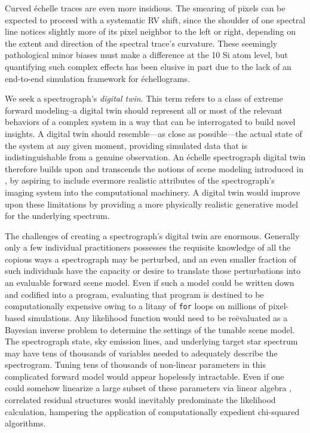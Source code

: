 \documentclass[twocolumn]{aastex631}
\begin{document}
Curved \'echelle traces are even more insidious.  The smearing of pixels can be expected to proceed with a systematic RV shift, since the shoulder of one spectral line notices slightly more of its pixel neighbor to the left or right, depending on the extent and direction of the spectral trace's curvature.  These seemingly pathological minor biases must make a difference at the 10 Si atom level, but quantifying such complex effects has been elusive in part due to the lack of an end-to-end simulation framework for \'echellograms.

We seek a spectrograph's \emph{digital twin}.  This term refers to a class of extreme forward modeling--a digital twin should represent all or most of the relevant behaviors of a complex system in a way that can be interrogated to build novel insights.  A digital twin should resemble---as close as possible---the actual state of the system at any given moment, providing simulated data that is indistinguishable from a genuine observation.  An \'echelle spectrograph digital twin therefore builds upon and transcends the notions of scene modeling introduced in \citet{2010PASP..122..248B}, by aspiring to include evermore realistic attributes of the spectrograph's imaging system into the computational machinery.  A digital twin would improve upon these limitations by providing a more physically realistic generative model for the underlying spectrum.

The challenges of creating a spectrograph's digital twin are enormous.  Generally only a few individual practitioners possesses the requisite knowledge of all the copious ways a spectrograph may be perturbed, and an even smaller fraction of such individuals have the capacity or desire to translate those perturbations into an evaluable forward scene model.  Even if such a model could be written down and codified into a program, evaluating that program is destined to be computationally expensive owing to a litany of \texttt{for} loops on millions of pixel-based simulations.  Any likelihood function would need to be re\"evaluated as a Bayesian inverse problem to determine the settings of the tunable scene model.  The spectrograph state, sky emission lines, and underlying target star spectrum may have tens of thousands of variables needed to adequately describe the spectrogram.  Tuning tens of thousands of non-linear parameters in this complicated forward model would appear hopelessly intractable.  Even if one could somehow linearize a large subset of these parameters via linear algebra \citep{2010PASP..122..248B}, correlated residual structures would inevitably predominate the likelihood calculation, hampering the application of computationally expedient chi-squared algorithms.
\end{document}
